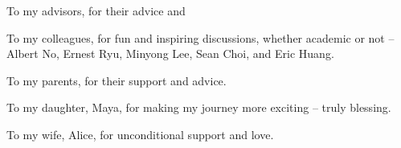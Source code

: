 To my advisors, for their advice and 

To my colleagues, for fun and inspiring discussions, whether academic or not -- Albert No, Ernest Ryu, Minyong Lee, Sean Choi, and Eric Huang. 

To my parents, for their support and advice. 

To my daughter, Maya, for making my journey more exciting -- truly blessing. 

To my wife, Alice, for unconditional support and love.


%
%




